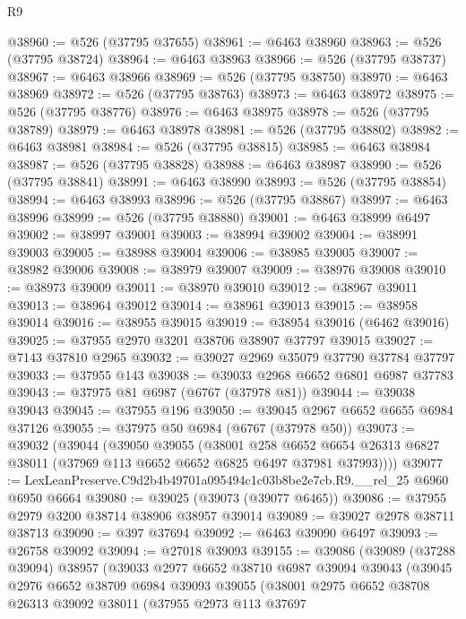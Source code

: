 \begin{lexlean}{R9}
\begin{coremodule}
@38960 := @526 (@37795 @37655)
@38961 := @6463 @38960
@38963 := @526 (@37795 @38724)
@38964 := @6463 @38963
@38966 := @526 (@37795 @38737)
@38967 := @6463 @38966
@38969 := @526 (@37795 @38750)
@38970 := @6463 @38969
@38972 := @526 (@37795 @38763)
@38973 := @6463 @38972
@38975 := @526 (@37795 @38776)
@38976 := @6463 @38975
@38978 := @526 (@37795 @38789)
@38979 := @6463 @38978
@38981 := @526 (@37795 @38802)
@38982 := @6463 @38981
@38984 := @526 (@37795 @38815)
@38985 := @6463 @38984
@38987 := @526 (@37795 @38828)
@38988 := @6463 @38987
@38990 := @526 (@37795 @38841)
@38991 := @6463 @38990
@38993 := @526 (@37795 @38854)
@38994 := @6463 @38993
@38996 := @526 (@37795 @38867)
@38997 := @6463 @38996
@38999 := @526 (@37795 @38880)
@39001 := @6463 @38999 @6497
@39002 := @38997 @39001
@39003 := @38994 @39002
@39004 := @38991 @39003
@39005 := @38988 @39004
@39006 := @38985 @39005
@39007 := @38982 @39006
@39008 := @38979 @39007
@39009 := @38976 @39008
@39010 := @38973 @39009
@39011 := @38970 @39010
@39012 := @38967 @39011
@39013 := @38964 @39012
@39014 := @38961 @39013
@39015 := @38958 @39014
@39016 := @38955 @39015
@39019 := @38954 @39016 (@6462 @39016)
@39025 := @37955 @2970 @3201 @38706 @38907 @37797 @39015
@39027 := @7143 @37810 @2965
@39032 := @39027 @2969 @35079 @37790 @37784 @37797
@39033 := @37955 @143
@39038 := @39033 @2968 @6652 @6801 @6987 @37783
@39043 := @37975 @81 @6987 (@6767 (@37978 @81))
@39044 := @39038 @39043
@39045 := @37955 @196
@39050 := @39045 @2967 @6652 @6655 @6984 @37126
@39055 := @37975 @50 @6984 (@6767 (@37978 @50))
@39073 := @39032
    (@39044
      (@39050
        @39055
        (@38001
          @258
          @6652
          @6654
          @26313
          @6827
          @38011
          (@37969 @113 @6652 @6652 @6825 @6497 @37981 @37993))))
@39077 := LexLeanPreserve.C9d2b4b49701a095494c1c03b8be2e7cb.R9.__rel_25 @6960 @6950 @6664
@39080 := @39025 (@39073 (@39077 @6465))
@39086 := @37955 @2979 @3200 @38714 @38906 @38957 @39014
@39089 := @39027 @2978 @38711 @38713
@39090 := @397 @37694
@39092 := @6463 @39090 @6497
@39093 := @26758 @39092
@39094 := @27018 @39093
@39155 := @39086
    (@39089
      (@37288 @39094)
      @38957
      (@39033
        @2977
        @6652
        @38710
        @6987
        @39094
        @39043
        (@39045
          @2976
          @6652
          @38709
          @6984
          @39093
          @39055
          (@38001
            @2975
            @6652
            @38708
            @26313
            @39092
            @38011
            (@37955
              @2973
              @113
              @37697

\end{coremodule}
\end{lexlean}
